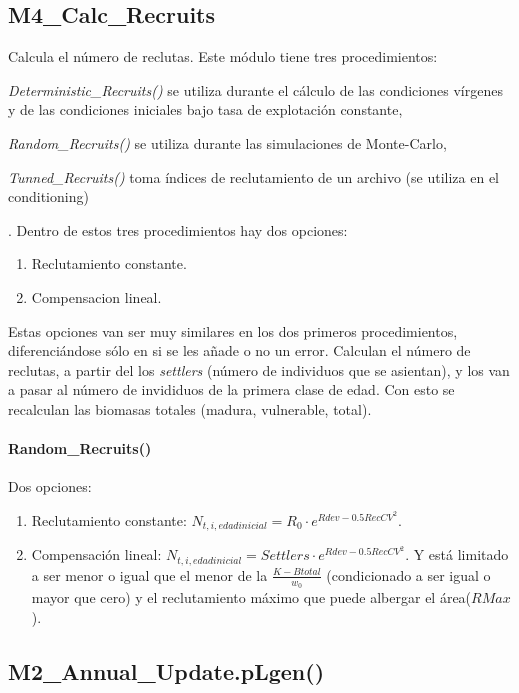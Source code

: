 \documentclass[12pt, oneside, a4paper]{article}
\begin{document}
		\subsection{M4\_Calc\_Recruits}
			Calcula el número de reclutas. Este módulo tiene tres procedimientos:\begin{inparaenum}[(i)] \item \emph{Deterministic\_Recruits()} se utiliza durante el cálculo de las condiciones vírgenes y de las condiciones iniciales bajo tasa de explotación constante, \item \emph{Random\_Recruits()} se utiliza durante las simulaciones de Monte-Carlo, \item \emph{Tunned\_Recruits()} toma índices de reclutamiento de un archivo (se utiliza en el conditioning) \end{inparaenum}.
			Dentro de estos tres procedimientos hay dos opciones: 
					\begin{enumerate}
						\item Reclutamiento constante. 
						\item Compensacion lineal.
					\end{enumerate}
			Estas opciones van ser muy similares en los dos primeros procedimientos, diferenciándose sólo en si se les añade o no un error. Calculan el número de reclutas, a partir del los \emph{settlers} (número de individuos que se asientan), y los van a pasar al número de invididuos de la primera clase de edad. Con esto se recalculan las biomasas totales (madura, vulnerable, total).
			\paragraph{Random\_Recruits()} 
				Dos opciones: 
					\begin{enumerate}
						\item Reclutamiento constante: $N_{t,i,edadinicial}= R_0 \cdot e^{Rdev-0.5 RecCV^2}$.
						\item Compensación lineal: $N_{t,i,edadinicial}=Settlers \cdot e^{Rdev-0.5 RecCV^2} $. Y está limitado a ser menor o igual que el menor de la $\frac{K - Btotal}{w_0}$ (condicionado a ser igual o mayor que cero) y el reclutamiento máximo que puede albergar el área($RMax$).
					\end{enumerate}
				
			
		\subsection{M2\_Annual\_Update.pLgen()}
\end{document}
